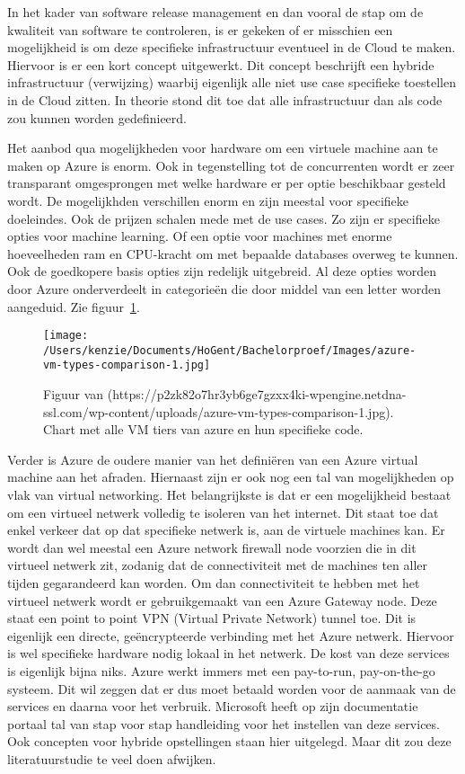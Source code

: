 In het kader van software release management en dan vooral de stap om de kwaliteit van software te controleren, is er gekeken of er misschien een mogelijkheid is om deze specifieke infrastructuur eventueel in de Cloud te maken. Hiervoor is er een kort concept uitgewerkt. Dit concept beschrijft een hybride infrastructuur (verwijzing) waarbij eigenlijk alle niet use case specifieke toestellen in de Cloud zitten. In theorie stond dit toe dat alle infrastructuur dan als code zou kunnen worden gedefinieerd.

Het aanbod qua mogelijkheden voor hardware om een virtuele machine aan te maken op Azure is enorm. Ook in tegenstelling tot de concurrenten wordt er zeer transparant omgesprongen met welke hardware er per optie beschikbaar gesteld wordt. De mogelijkhden verschillen enorm en zijn meestal voor specifieke doeleindes. Ook de prijzen schalen mede met de use cases. Zo zijn er specifieke opties voor machine learning. Of een optie voor machines met enorme hoeveelheden ram en CPU-kracht om met bepaalde databases overweg te kunnen. Ook de goedkopere basis opties zijn redelijk uitgebreid. Al deze opties worden door Azure onderverdeelt in categorieën die door middel van een letter worden aangeduid. Zie figuur~\ref{fig:Chart_Azure_tiers}.
\begin{figure}[!htbp]
    \centering
    \texttt{[image: /Users/kenzie/Documents/HoGent/Bachelorproef/Images/azure-vm-types-comparison-1.jpg]}
    \caption{Figuur van (https://p2zk82o7hr3yb6ge7gzxx4ki-wpengine.netdna-ssl.com/wp-content/uploads/azure-vm-types-comparison-1.jpg). Chart met alle VM tiers van azure en hun specifieke code.}
    \label{fig:Chart_Azure_tiers}
\end{figure}
Verder is Azure de oudere manier van het definiëren van een Azure virtual machine aan het afraden. Hiernaast zijn er ook nog een tal van mogelijkheden op vlak van virtual networking. Het belangrijkste is dat er een mogelijkheid bestaat om een virtueel netwerk volledig te isoleren van het internet. Dit staat toe dat enkel verkeer dat op dat specifieke netwerk is, aan de virtuele machines kan. Er wordt dan wel meestal een Azure network firewall node voorzien die in dit virtueel netwerk zit, zodanig dat de connectiviteit met de machines ten aller tijden gegarandeerd kan worden. Om dan connectiviteit te hebben met het virtueel netwerk wordt er gebruikgemaakt van een Azure Gateway node. Deze staat een point to point VPN (Virtual Private Network) tunnel toe. Dit is eigenlijk een directe, geëncrypteerde verbinding met het Azure netwerk. Hiervoor is wel specifieke hardware nodig lokaal in het netwerk. De kost van deze services is eigenlijk bijna niks. Azure werkt immers met een pay-to-run, pay-on-the-go systeem. Dit wil zeggen dat er dus moet betaald worden voor de aanmaak van de services en daarna voor het verbruik. Microsoft heeft op zijn documentatie portaal tal van stap voor stap handleiding voor het instellen van deze services. Ook concepten voor hybride opstellingen staan hier uitgelegd. Maar dit zou deze literatuurstudie te veel doen afwijken.


